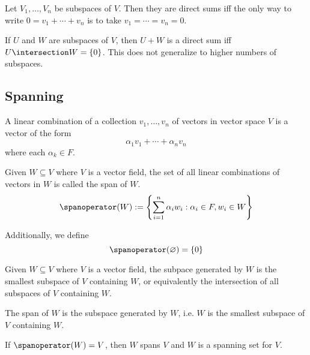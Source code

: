 \begin{theorem}
  Let $V_1, \ldots, V_n$ be subspaces of $V$. Then they are direct sums iff the only way to write $0 = v_1 + \cdots + v_n$ is to take $v_1 = \cdots = v_n = 0$.
\end{theorem}

\begin{theorem}
  If $U$ and $W$ are subspaces of $V$, then $U + W$ is a direct sum iff $U \intersection W = \{ 0 \}$. This does not generalize to higher numbers of subspaces.
\end{theorem}

\subsection{Spanning}

\begin{definition}
  A linear combination of a collection $v_1, \ldots, v_n$ of vectors in vector space $V$ is a vector of the form
  \[
    \alpha_1 v_1 + \cdots + \alpha_n v_n
  \]
  where each $\alpha_k \in F$.
\end{definition}

\begin{definition}[Span]
  Given $W \subseteq V$ where $V$ is a vector field, the set of all linear combinations of vectors in $W$ is called the span of $W$.
  \[
    \spanoperator(W) := \left\{ \sum_{i = 1}^n \alpha_i w_i : \alpha_i \in F, w_i \in W \right\}
  \]

  Additionally, we define
  \[
    \spanoperator(\varnothing) = \{ 0 \}
  \]
\end{definition}

\begin{definition}
  Given $W \subseteq V$ where $V$ is a vector field, the subpace generated by $W$ is the smallest subspace of $V$ containing $W$, or equivalently the intersection of all subspaces of $V$ containing $W$.
\end{definition}

\begin{theorem}
  The span of $W$ is the subspace generated by $W$, i.e. $W$ is the smallest subspace of $V$ containing $W$.
\end{theorem}

\begin{definition}
  If $\spanoperator(W) = V$, then $W$ spans $V$ and $W$ is a spanning set for $V$.
\end{definition}

